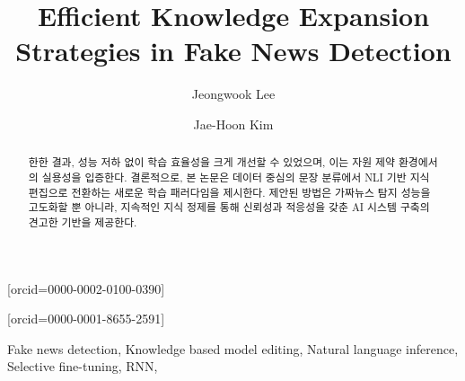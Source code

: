 \documentclass[a4paper,fleqn]{cas-sc}
\begin{document}
\let\WriteBookmarks\relax


\def\floatpagepagefraction{1}
\def\textpagefraction{.001}



\title [mode = title]{Efficient Knowledge Expansion Strategies in Fake News Detection}

\author[1]{Jeongwook Lee}[orcid=0000-0002-0100-0390]

\author[1]{Jae-Hoon Kim}[orcid=0000-0001-8655-2591]
\cormark[1]




\begin{abstract}
    한한 결과, 성능 저하 없이 학습 효율성을 크게 개선할 수 있었으며, 이는 자원 제약 환경에서의 실용성을 입증한다. 
    결론적으로, 본 논문은 데이터 중심의 문장 분류에서 NLI 기반 지식 편집으로 전환하는 새로운 학습 패러다임을 제시한다. 
    제안된 방법은 가짜뉴스 탐지 성능을 고도화할 뿐 아니라, 지속적인 지식 정제를 통해 신뢰성과 적응성을 갖춘 AI 시스템 구축의 견고한 기반을 제공한다. 
\end{abstract}



\begin{keywords}
 Fake news detection\sep
 Knowledge based model editing\sep
 Natural language inference\sep
 Selective fine-tuning\sep
 RNN\sep
\end{keywords}
\end{document}
